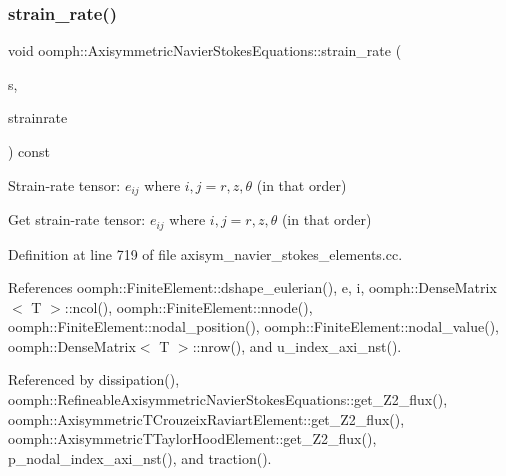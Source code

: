 \mbox{\label{classoomph_1_1AxisymmetricNavierStokesEquations_ad12929a11d71f7d91627f3edc8f2cdce}} 
\subsubsection{\texorpdfstring{strain\+\_\+rate()}{strain\_rate()}}
{\footnotesize\ttfamily void oomph\+::\+Axisymmetric\+Navier\+Stokes\+Equations\+::strain\+\_\+rate (\begin{DoxyParamCaption}\item[{const \hyperlink{classoomph_1_1Vector}{Vector}$<$ double $>$ \&}]{s,  }\item[{\hyperlink{classoomph_1_1DenseMatrix}{Dense\+Matrix}$<$ double $>$ \&}]{strainrate }\end{DoxyParamCaption}) const}



Strain-\/rate tensor\+: $ e_{ij} $ where $ i,j = r,z,\theta $ (in that order) 

Get strain-\/rate tensor\+: $ e_{ij} $ where $ i,j = r,z,\theta $ (in that order) 

Definition at line 719 of file axisym\+\_\+navier\+\_\+stokes\+\_\+elements.\+cc.



References oomph\+::\+Finite\+Element\+::dshape\+\_\+eulerian(), e, i, oomph\+::\+Dense\+Matrix$<$ T $>$\+::ncol(), oomph\+::\+Finite\+Element\+::nnode(), oomph\+::\+Finite\+Element\+::nodal\+\_\+position(), oomph\+::\+Finite\+Element\+::nodal\+\_\+value(), oomph\+::\+Dense\+Matrix$<$ T $>$\+::nrow(), and u\+\_\+index\+\_\+axi\+\_\+nst().



Referenced by dissipation(), oomph\+::\+Refineable\+Axisymmetric\+Navier\+Stokes\+Equations\+::get\+\_\+\+Z2\+\_\+flux(), oomph\+::\+Axisymmetric\+T\+Crouzeix\+Raviart\+Element\+::get\+\_\+\+Z2\+\_\+flux(), oomph\+::\+Axisymmetric\+T\+Taylor\+Hood\+Element\+::get\+\_\+\+Z2\+\_\+flux(), p\+\_\+nodal\+\_\+index\+\_\+axi\+\_\+nst(), and traction().

\mbox{\label{classoomph_1_1AxisymmetricNavierStokesEquations_a0a5523b91d5191c2f9e23fe8d74f4e07}} 
